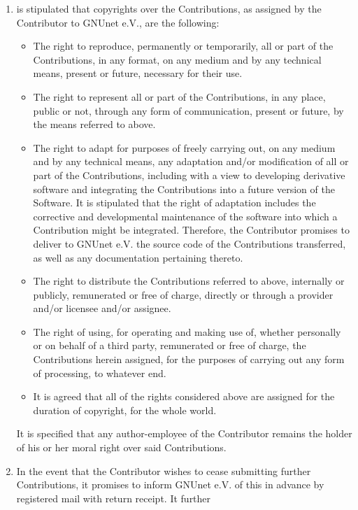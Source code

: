 \documentclass[a4paper]{article} %
\newenvironment{enumpar}{%
  \renewcommand{\labelenumi}{\theenumi}%
  \renewcommand{\theenumi}{(\arabic{enumi})}%
  \renewcommand{\labelenumii}{\theenumii}%
  \renewcommand{\theenumii}{(\alph{enumii})}%
  \begin{enumerate}}
{\end{enumerate}}
\begin{document}
\begin{enumpar}
  \item is stipulated that copyrights over the Contributions, as
    assigned by the Contributor to GNUnet e.V., are the following:
  \begin{itemize}
    \item The right to reproduce, permanently or temporarily, all or
      part of the Contributions, in any format, on any medium and by
      any technical means, present or future, necessary for their use.
    \item The right to represent all or part of the Contributions, in
      any place, public or not, through any form of communication,
      present or future, by the means referred to above.
    \item The right to adapt for purposes of freely carrying out, on
      any medium and by any technical means, any adaptation and/or
      modification of all or part of the Contributions, including with
      a view to developing derivative software and integrating the
      Contributions into a future version of the Software. It is
      stipulated that the right of adaptation includes the corrective
      and developmental maintenance of the software into which a
      Contribution might be integrated.  Therefore, the Contributor
      promises to deliver to GNUnet e.V. the source code of the
      Contributions transferred, as well as any documentation
      pertaining thereto.
    \item The right to distribute the Contributions referred to above,
      internally or publicly, remunerated or free of charge, directly
      or through a provider and/or licensee and/or assignee.
    \item The right of using, for operating and making use of, whether
      personally or on behalf of a third party, remunerated or free of
      charge, the Contributions herein assigned, for the purposes of
      carrying out any form of processing, to whatever end.
    \item It is agreed that all of the rights considered above are
      assigned for the duration of copyright, for the whole world.
  \end{itemize}
  It is specified that any author-employee of the Contributor remains
  the holder of his or her moral right over said Contributions.
  \item In the event that the Contributor wishes to cease submitting
    further Contributions, it promises to inform GNUnet e.V. of this
    in advance by registered mail with return receipt. It further

\end{enumpar}
\end{document}
